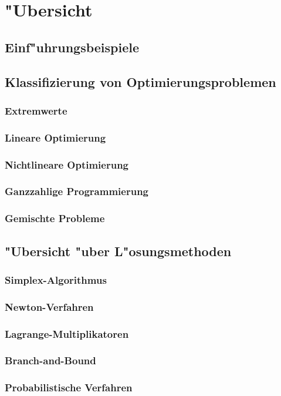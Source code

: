 \chapter{"Ubersicht}

\section{Einf"uhrungsbeispiele}

\section{Klassifizierung von Optimierungsproblemen}
\subsection{Extremwerte}
\subsection{Lineare Optimierung}
\subsection{Nichtlineare Optimierung}
\subsection{Ganzzahlige Programmierung}
\subsection{Gemischte Probleme}

\section{"Ubersicht "uber L"osungsmethoden}
\subsection{Simplex-Algorithmus}
\subsection{Newton-Verfahren}
\subsection{Lagrange-Multiplikatoren}
\subsection{Branch-and-Bound}
\subsection{Probabilistische Verfahren}

